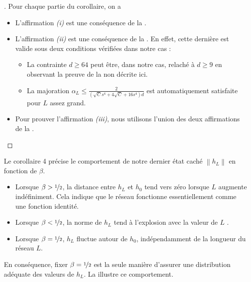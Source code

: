 \begin{proof}[]
    Pour chaque partie du corollaire, on a
    \begin{itemize}
        \item L'affirmation \textit{(i)} est une conséquence de la .
        \item L'affirmation \textit{(ii)} est une conséquence de la . En effet, cette dernière est valide sous deux conditions vérifiées dans notre cas : \begin{itemize}
            \item La contrainte $ d \geqslant 64 $ peut être, dans notre cas, relaché à $ d \geqslant 9 $ en observant la preuve de la  non décrite ici.
            \item La majoration $ \alpha _L \leqslant \frac{2}{(\sqrt{C} s^4 + 4 \sqrt{C} + 16s^4)d} $ est automatiquement satisfaite pour $ L $ assez grand.
        \end{itemize}
        \item Pour prouver l'affirmation \textit{(iii)}, nous utilisons l'union des deux affirmations de la .
    \end{itemize}
\end{proof}

Le corollaire 4 précise le comportement de notre dernier état caché $\left\| h_L \right\|$ en fonction de $\beta$.
\begin{itemize}
    \item Lorsque $\beta > \nicefrac{1}{2}$, la distance entre $h_L$ et $h_0$ tend vers zéro lorsque $L$ augmente indéfiniment. Cela indique que le réseau fonctionne essentiellement comme une fonction identité.
    \item Lorsque $\beta < \nicefrac{1}{2}$, la norme de $h_L$ tend à l'explosion avec la valeur de $ L $ .
    \item Lorsque $\beta = \nicefrac{1}{2}$, $h_L$ fluctue autour de $h_0$, indépendamment de la longueur du réseau $L$.
\end{itemize}
En conséquence, fixer $\beta = \nicefrac{1}{2}$ est la seule manière d'assurer une distribution adéquate des valeurs de $h_L$. La  illustre ce comportement.

